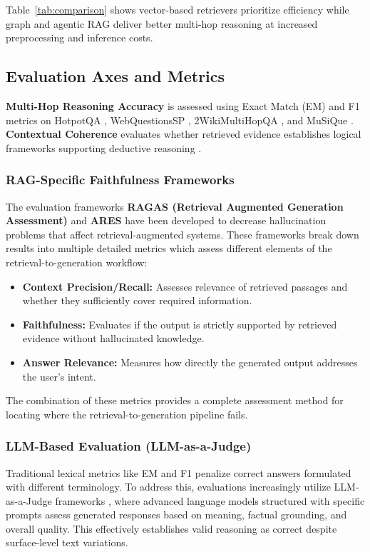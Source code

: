 \documentclass[runningheads]{llncs}
\begin{document}
Table~\ref{tab:comparison} shows vector-based retrievers prioritize efficiency while graph and agentic RAG deliver better multi-hop reasoning at increased preprocessing and inference costs.

\subsection{Evaluation Axes and Metrics}

\textbf{Multi-Hop Reasoning Accuracy} is assessed using Exact Match (EM) and F1 metrics on HotpotQA \cite{28}, WebQuestionsSP \cite{61}, 2WikiMultiHopQA \cite{75}, and MuSiQue \cite{29}. \textbf{Contextual Coherence} evaluates whether retrieved evidence establishes logical frameworks supporting deductive reasoning \cite{11,12}.

\subsubsection{RAG-Specific Faithfulness Frameworks}
The evaluation frameworks \textbf{RAGAS (Retrieval Augmented Generation Assessment)} \cite{91} and \textbf{ARES} \cite{92} have been developed to decrease hallucination problems that affect retrieval-augmented systems. These frameworks break down results into multiple detailed metrics which assess different elements of the retrieval-to-generation workflow:
\begin{itemize}
\item \textbf{Context Precision/Recall:} Assesses relevance of retrieved passages and whether they sufficiently cover required information.
\item \textbf{Faithfulness:} Evaluates if the output is strictly supported by retrieved evidence without hallucinated knowledge.
\item \textbf{Answer Relevance:} Measures how directly the generated output addresses the user's intent.
\end{itemize}
The combination of these metrics provides a complete assessment method for locating where the retrieval-to-generation pipeline fails.

\subsubsection{LLM-Based Evaluation (LLM-as-a-Judge)}
Traditional lexical metrics like EM and F1 penalize correct answers formulated with different terminology. To address this, evaluations increasingly utilize LLM-as-a-Judge frameworks \cite{93}, where advanced language models structured with specific prompts assess generated responses based on meaning, factual grounding, and overall quality. This effectively establishes valid reasoning as correct despite surface-level text variations.
\end{document}
